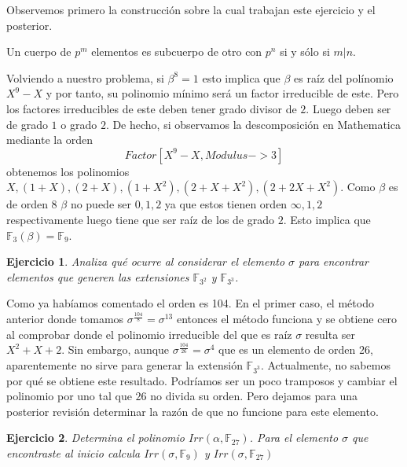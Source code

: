\documentclass{article}
\theoremstyle{theorem-style}  %
\theoremstyle{definition-style}
\theoremstyle{example-style}
\newtheorem{exercise}{Ejercicio}[section]
\begin{document}
Observemos primero la construcción sobre la cual trabajan este ejercicio y el posterior. 


Un cuerpo de $p^m$ elementos es subcuerpo de otro con $p^n$ si y sólo si $m|n$. 

Volviendo a nuestro problema, si $\beta^8 = 1$ esto implica que $\beta$ es raíz del polínomio $X^9 - X$ y por tanto, su polinomio mínimo será un factor irreducible de este. Pero los factores irreducibles de este deben tener grado divisor de $2$. Luego deben ser de grado $1$ o grado $2$. De hecho, si observamos la descomposición en Mathematica mediante la orden $$Factor[X^9-X,Modulus->3]$$ obtenemos los polinomios $X,(1 + X),(2 + X),(1 + X^2),(2 + X + X^2),(2 + 2 X + X^2)$. Como $\beta$ es de orden $8$ $\beta$ no puede ser $0,1,2$ ya que estos tienen orden $\infty,1,2$ respectivamente luego tiene que ser raíz de los de grado $2$. Esto implica que $\mathbb{F}_3(\beta) = \mathbb{F}_9$. 

\begin{exercise}
	Analiza qué ocurre al considerar el elemento $\sigma$ para encontrar elementos que generen las extensiones $\mathbb{F}_{3^2}$ y $\mathbb{F}_{3^3}$.
\end{exercise}

Como ya habíamos comentado el orden es 104. En el primer caso, el método anterior donde tomamos $\sigma^{\frac{104}{8}} = \sigma^13$ entonces el método funciona y se obtiene cero al comprobar donde el polinomio irreducible del que es raíz $\sigma$ resulta ser $X^2+X+2$. Sin embargo, aunque $\sigma^{\frac{104}{26}} = \sigma^4$ que es un elemento de orden 26, aparentemente no sirve para generar la extensión $\mathbb{F}_{3^3}$. Actualmente, no sabemos por qué se obtiene este resultado. Podríamos ser un poco tramposos y cambiar el polinomio por uno tal que $26$ no divida su orden. Pero dejamos para una posterior revisión determinar la razón de que no funcione para este elemento. 

\begin{exercise}
	Determina el polinomio $Irr(\alpha,\mathbb{F}_{27})$. Para el elemento $\sigma$ que encontraste al inicio calcula $Irr(\sigma,\mathbb{F}_9)$ y $Irr(\sigma,\mathbb{F}_{27})$
\end{exercise}
\end{document}

